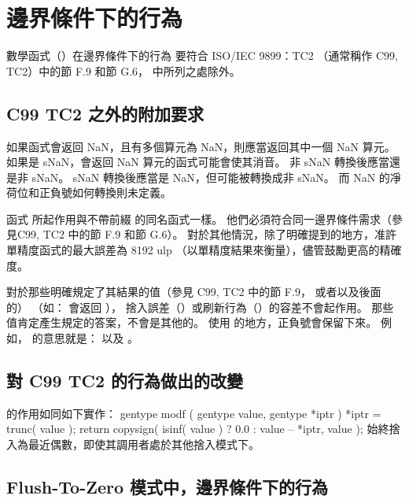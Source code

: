 \section[sec:edgeCaseBehavior]{邊界條件下的行為}

數學函式（）在邊界條件下的行為
要符合 ISO/IEC 9899：TC2 （通常稱作 C99, TC2）中的節 F.9 和節 G.6，
中所列之處除外。

\subsection[sec:addReqBeyondC99]{C99 TC2 之外的附加要求}

如果函式會返回 NaN，且有多個算元為 NaN，則應當返回其中一個 NaN 算元。
如果是 sNaN，會返回 NaN 算元的函式可能會使其消音。
非 sNaN 轉換後應當還是非 sNaN。
sNaN 轉換後應當是 NaN，但可能被轉換成非 sNaN。
而 NaN 的凈荷位和正負號如何轉換則未定義。

函式  所起作用與不帶前綴  的同名函式一樣。
他們必須符合同一邊界條件需求（參見C99, TC2 中的節 F.9 和節 G.6）。
對於其他情況，除了明確提到的地方，准許單精度函式的最大誤差為 8192 ulp
（以單精度結果來衡量），儘管鼓勵更高的精確度。

對於那些明確規定了其結果的值（參見 C99, TC2 中的節 F.9，
或者以及後面的）
（如：  會返回 ），
捨入誤差（）或刷新行為（）的容差不會起作用。
那些值肯定產生規定的答案，不會是其他的。
使用 \math{\pm} 的地方，正負號會保留下來。
例如，  的意思就是：
 以及 。



\subsection{對 C99 TC2 的行為做出的改變}

 的作用如同如下實作：
\startclc[indentnext=no]
gentype modf ( gentype value, gentype *iptr )
{
	*iptr = trunc( value );
	return copysign( isinf( value ) ? 0.0 : value – *iptr, value );
}
\stopclc
{} 始終捨入為最近偶數，即使其調用者處於其他捨入模式下。

\subsection[sec:ftzmECB]{Flush-To-Zero 模式中，邊界條件下的行為}

